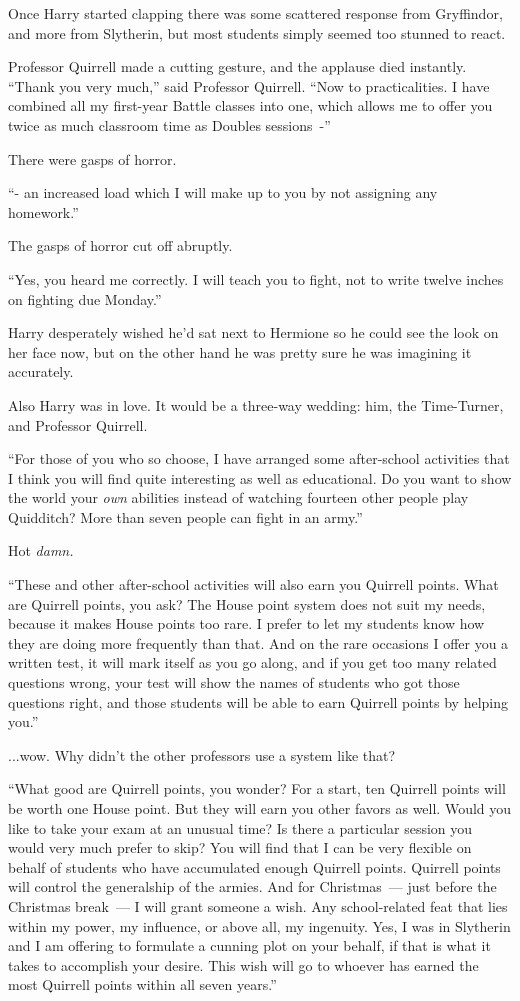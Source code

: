 Once Harry started clapping there was some scattered response from Gryffindor, and more from Slytherin, but most students simply seemed too stunned to react.

Professor Quirrell made a cutting gesture, and the applause died instantly. ``Thank you very much,'' said Professor Quirrell. ``Now to practicalities. I have combined all my first-year Battle classes into one, which allows me to offer you twice as much classroom time as Doubles sessions~-''

There were gasps of horror.

``- an increased load which I will make up to you by not assigning any homework.''

The gasps of horror cut off abruptly.

``Yes, you heard me correctly. I will teach you to fight, not to write twelve inches on fighting due Monday.''

Harry desperately wished he'd sat next to Hermione so he could see the look on her face now, but on the other hand he was pretty sure he was imagining it accurately.

Also Harry was in love. It would be a three-way wedding: him, the Time-Turner, and Professor Quirrell.

``For those of you who so choose, I have arranged some after-school activities that I think you will find quite interesting as well as educational. Do you want to show the world your \emph{own} abilities instead of watching fourteen other people play Quidditch? More than seven people can fight in an army.''

Hot \emph{damn.}

``These and other after-school activities will also earn you Quirrell points. What are Quirrell points, you ask? The House point system does not suit my needs, because it makes House points too rare. I prefer to let my students know how they are doing more frequently than that. And on the rare occasions I offer you a written test, it will mark itself as you go along, and if you get too many related questions wrong, your test will show the names of students who got those questions right, and those students will be able to earn Quirrell points by helping you.''

...wow. Why didn't the other professors use a system like that?

``What good are Quirrell points, you wonder? For a start, ten Quirrell points will be worth one House point. But they will earn you other favors as well. Would you like to take your exam at an unusual time? Is there a particular session you would very much prefer to skip? You will find that I can be very flexible on behalf of students who have accumulated enough Quirrell points. Quirrell points will control the generalship of the armies. And for Christmas~--- just before the Christmas break~--- I will grant someone a wish. Any school-related feat that lies within my power, my influence, or above all, my ingenuity. Yes, I was in Slytherin and I am offering to formulate a cunning plot on your behalf, if that is what it takes to accomplish your desire. This wish will go to whoever has earned the most Quirrell points within all seven years.''

